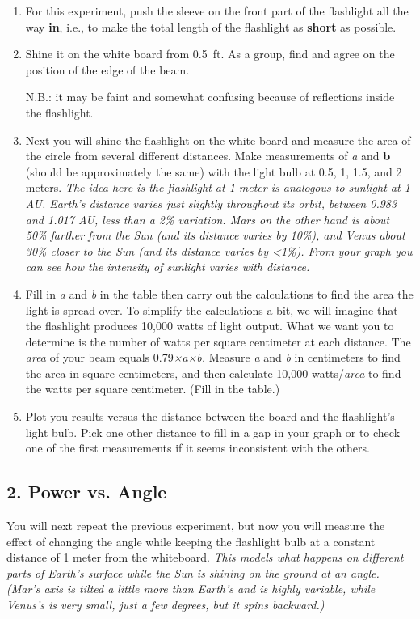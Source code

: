 \documentclass[main.tex]{subfiles}
\begin{document}
\begin{enumerate}[1.]
\item For this experiment, push the sleeve on the front part of the flashlight all the way \textbf{in}, i.e., to make the total length of the flashlight as \textbf{short} as possible.

\item Shine it on the white board from \SI{0.5}{ft}. As a group, find and agree on the position of the edge of the beam.

N.B.: it may be faint and somewhat confusing because of reflections inside the flashlight.

\item Next you will shine the flashlight on the white board and measure the area of the circle from several different distances. Make measurements of \textit{a} and \textbf{b} (should be approximately the same) with the light bulb at 0.5, 1, 1.5, and 2 meters. \textit{The idea here is the flashlight at 1 meter is analogous to sunlight at 1 AU. Earth's distance varies just slightly throughout its orbit, between 0.983 and 1.017 AU, less than a 2\% variation. Mars on the other hand is about 50\% farther from the Sun (and its distance varies by 10\%), and Venus about 30\% closer to the Sun (and its distance varies by <1\%). From your graph you can see how the intensity of sunlight varies with distance.}

\item Fill in \textit{a} and \textit{b} in the table then carry out the calculations to find the area the light is spread over. To simplify the calculations a bit, we will imagine that the flashlight produces 10,000 watts of light output. What we want you to determine is the number of watts per square centimeter at each distance. The \textit{area} of your beam equals 0.79\textit{×a×b.} Measure \textit{a} and \textit{b} in centimeters to find the area in square centimeters, and then calculate 10,000 watts/\textit{area} to find the watts per square centimeter. (Fill in the table.) 
\item Plot you results versus the distance between the board and the flashlight's light bulb. Pick one other distance to fill in a gap in your graph or to check one of the first measurements if it seems inconsistent with the others.

\end{enumerate}

\subsection*{2. Power vs. Angle}
You will next repeat the previous experiment, but now you will measure the effect of changing the angle while keeping the flashlight bulb at a constant distance of 1 meter from the whiteboard. \textit{This models what happens on different parts of Earth's surface while the Sun is shining on the ground at an angle. (Mar's axis is tilted a little more than Earth's and is highly variable, while Venus's is very small, just a few degrees, but it spins backward.)}
\end{document}
